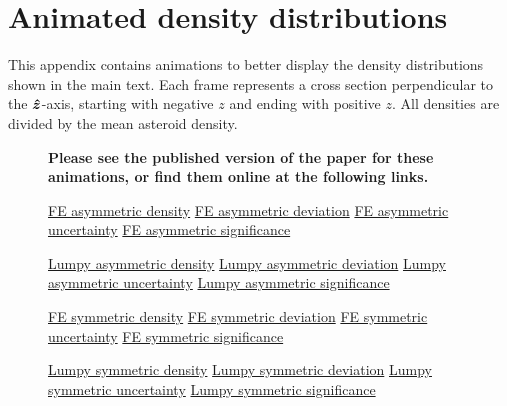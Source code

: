 \section{Animated density distributions}

This appendix contains animations to better display the density distributions shown in the main text. Each frame represents a cross section perpendicular to the $\bm{\hat{z}}$-axis, starting with negative $z$ and ending with positive $z$. All densities are divided by the mean asteroid density.

\begin{figure*}
  \textbf{Please see the published version of the paper for these animations, or find them online at the following links.}

  \href{https://github.com/jack-dinsmore/asteroid-tidal-torque/tree/main/paper/gifs/asym-fe-d.mp4}{FE asymmetric density} \hfill
  \href{https://github.com/jack-dinsmore/asteroid-tidal-torque/tree/main/paper/gifs/asym-fe-s.mp4}{FE asymmetric deviation} \hfill
  \href{https://github.com/jack-dinsmore/asteroid-tidal-torque/tree/main/paper/gifs/asym-fe-u.mp4}{FE asymmetric uncertainty} \hfill
  \href{https://github.com/jack-dinsmore/asteroid-tidal-torque/tree/main/paper/gifs/asym-fe-r.mp4}{FE asymmetric significance}

  \href{https://github.com/jack-dinsmore/asteroid-tidal-torque/tree/main/paper/gifs/asym-l-d.mp4}{Lumpy asymmetric density} \hfill
  \href{https://github.com/jack-dinsmore/asteroid-tidal-torque/tree/main/paper/gifs/asym-l-s.mp4}{Lumpy asymmetric deviation} \hfill
  \href{https://github.com/jack-dinsmore/asteroid-tidal-torque/tree/main/paper/gifs/asym-l-u.mp4}{Lumpy asymmetric uncertainty} \hfill
  \href{https://github.com/jack-dinsmore/asteroid-tidal-torque/tree/main/paper/gifs/asym-l-r.mp4}{Lumpy asymmetric significance}

  \href{https://github.com/jack-dinsmore/asteroid-tidal-torque/tree/main/paper/gifs/sym-fe-d.mp4}{FE symmetric density} \hfill
  \href{https://github.com/jack-dinsmore/asteroid-tidal-torque/tree/main/paper/gifs/sym-fe-s.mp4}{FE symmetric deviation} \hfill
  \href{https://github.com/jack-dinsmore/asteroid-tidal-torque/tree/main/paper/gifs/sym-fe-u.mp4}{FE symmetric uncertainty} \hfill
  \href{https://github.com/jack-dinsmore/asteroid-tidal-torque/tree/main/paper/gifs/sym-fe-r.mp4}{FE symmetric significance}

  \href{https://github.com/jack-dinsmore/asteroid-tidal-torque/tree/main/paper/gifs/sym-l-d.mp4}{Lumpy symmetric density} \hfill
  \href{https://github.com/jack-dinsmore/asteroid-tidal-torque/tree/main/paper/gifs/sym-l-s.mp4}{Lumpy symmetric deviation} \hfill
  \href{https://github.com/jack-dinsmore/asteroid-tidal-torque/tree/main/paper/gifs/sym-l-u.mp4}{Lumpy symmetric uncertainty} \hfill
  \href{https://github.com/jack-dinsmore/asteroid-tidal-torque/tree/main/paper/gifs/sym-l-r.mp4}{Lumpy symmetric significance}


\end{figure*}
